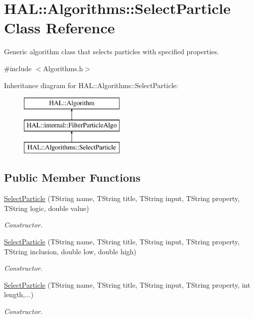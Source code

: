 \hypertarget{class_h_a_l_1_1_algorithms_1_1_select_particle}{\section{H\-A\-L\-:\-:Algorithms\-:\-:Select\-Particle Class Reference}
\label{class_h_a_l_1_1_algorithms_1_1_select_particle}
}


Generic algorithm class that selects particles with specified properties.  




{\ttfamily \#include $<$Algorithms.\-h$>$}

Inheritance diagram for H\-A\-L\-:\-:Algorithms\-:\-:Select\-Particle\-:\begin{figure}[H]
\begin{center}
\leavevmode
\includegraphics[height=3.000000cm]{class_h_a_l_1_1_algorithms_1_1_select_particle}
\end{center}
\end{figure}
\subsection*{Public Member Functions}
\begin{DoxyCompactItemize}
\item 
\hyperlink{class_h_a_l_1_1_algorithms_1_1_select_particle_a54e0c4f2c30c5dadd99c92c2d74ed37c}{Select\-Particle} (T\-String name, T\-String title, T\-String input, T\-String property, T\-String logic, double value)
\begin{DoxyCompactList}\small\item\em Constructor. \end{DoxyCompactList}\item 
\hyperlink{class_h_a_l_1_1_algorithms_1_1_select_particle_a66727ef056247051056804562276ff84}{Select\-Particle} (T\-String name, T\-String title, T\-String input, T\-String property, T\-String inclusion, double low, double high)
\begin{DoxyCompactList}\small\item\em Constructor. \end{DoxyCompactList}\item 
\hyperlink{class_h_a_l_1_1_algorithms_1_1_select_particle_a0eaa8644614c2d1d2db3b79e5c189a9a}{Select\-Particle} (T\-String name, T\-String title, T\-String input, T\-String property, int length,...)
\begin{DoxyCompactList}\small\item\em Constructor. \end{DoxyCompactList}\end{DoxyCompactItemize}

